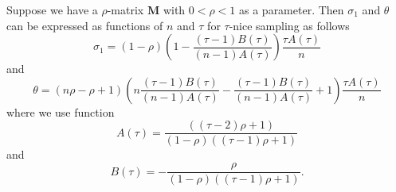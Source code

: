 \documentclass[10pt,a4paper]{amsart}
\begin{document}
	\begin{proposition}
		Suppose we have a $\rho$-matrix $\mathbf{M}$ with $0<\rho<1$ as a parameter. Then $\sigma_1$ and $ \theta$ can be expressed as functions of $n$ and $\tau$ for $\tau$-nice sampling as follows 
		\begin{equation}
			\sigma_1=(1-\rho)\left(1-\frac{(\tau-1)B(\tau)}{(n-1)A(\tau)}\right)\frac{\tau A(\tau)}{n}
		\end{equation}
		and 
		\begin{equation}
			 \theta=(n\rho-\rho+1)\left(n\frac{(\tau-1)B(\tau)}{(n-1)A(\tau)}-\frac{(\tau-1)B(\tau)}{(n-1)A(\tau)}+1\right)\frac{\tau A(\tau)}{n}
		\end{equation}
		where we use function
		\begin{equation}
			A(\tau)=\frac{((\tau-2)\rho+1)}{(1-\rho)((\tau-1)\rho+1)}
		\end{equation}
		and 
		\begin{equation}
			B(\tau)=-\frac{\rho}{(1-\rho)((\tau-1)\rho+1)}.
		\end{equation}
	\end{proposition}
\end{document}
